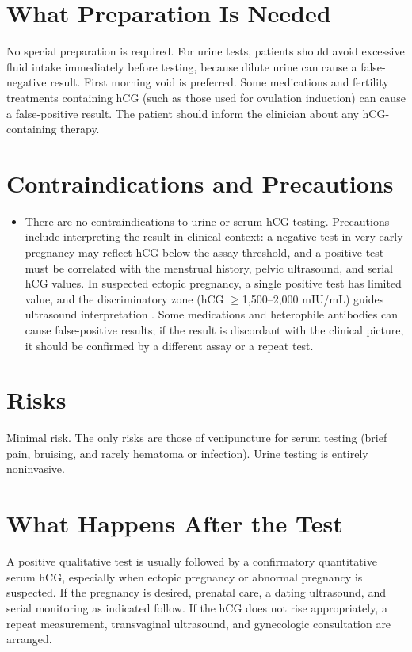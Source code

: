 \section*{What Preparation Is Needed}
No special preparation is required. For urine tests, patients should avoid excessive fluid intake immediately before testing, because dilute urine can cause a false-negative result. First morning void is preferred. Some medications and fertility treatments containing hCG (such as those used for ovulation induction) can cause a false-positive result. The patient should inform the clinician about any hCG-containing therapy.
\section*{Contraindications and Precautions}
\begin{itemize}
  \item There are no contraindications to urine or serum hCG testing. Precautions include interpreting the result in clinical context: a negative test in very early pregnancy may reflect hCG below the assay threshold, and a positive test must be correlated with the menstrual history, pelvic ultrasound, and serial hCG values. In suspected ectopic pregnancy, a single positive test has limited value, and the discriminatory zone (hCG $\geq$1,500--2,000 mIU/mL) guides ultrasound interpretation \cite{acog2018tubal}. Some medications and heterophile antibodies can cause false-positive results; if the result is discordant with the clinical picture, it should be confirmed by a different assay or a repeat test.
\end{itemize}
\section*{Risks}
Minimal risk. The only risks are those of venipuncture for serum testing (brief pain, bruising, and rarely hematoma or infection). Urine testing is entirely noninvasive.
\section*{What Happens After the Test}
A positive qualitative test is usually followed by a confirmatory quantitative serum hCG, especially when ectopic pregnancy or abnormal pregnancy is suspected. If the pregnancy is desired, prenatal care, a dating ultrasound, and serial monitoring as indicated follow. If the hCG does not rise appropriately, a repeat measurement, transvaginal ultrasound, and gynecologic consultation are arranged.
